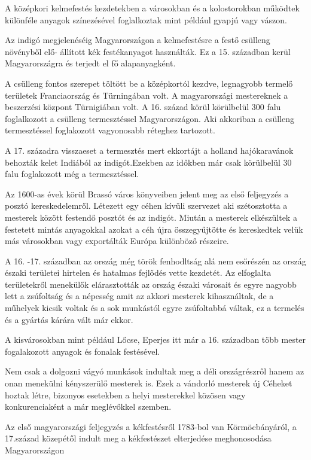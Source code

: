 \documentclass[fontsize=12pt, appendixprefix=true]{scrreprt}
\begin{document}
A középkori kelmefestés kezdetekben a városokban és a kolostorokban működtek különféle anyagok színezésével foglalkoztak mint például gyapjú vagy vászon. 

Az indigó megjelenéséig Magyarországon a kelmefestésre a festő csülleng növényből elő- állított kék festékanyagot használták. Ez a 15. században  kerül Magyarországra és terjedt el fő alapanyagként.

A csülleng fontos szerepet töltött be a középkortól kezdve, legnagyobb termelő területek Franciaország és Türningában volt. A magyarországi mestereknek a beszerzési központ Türnigiában volt.
A 16. század körül körülbelül 300 falu foglalkozott a csülleng termesztéssel Magyarországon. Aki akkoriban a csülleng termesztéssel foglakozott vagyonosabb réteghez tartozott. 

A 17. századra visszaeset  a termesztés mert ekkortájt a holland hajókaravánok behozták kelet Indiából az indigót.Ezekben az időkben már csak körülbelül 30 falu foglakozott még a termesztéssel.

Az 1600-as évek körül Brassó város könyveiben jelent meg az első feljegyzés a posztó kereskedelemről.
Létezett egy céhen kívüli szervezet aki szétosztotta  a mesterek között festendő posztót és az indigót. 
Miután a mesterek elkészültek a festetett mintás anyagokkal azokat a céh újra összegyűjtötte és kereskedtek  velük más városokban vagy exportálták Európa különböző részeire.

A 16. -17. században az ország még török fenhodltság alá nem esőrészén az ország északi területei hirtelen és hatalmas fejlődés vette kezdetét.
Az elfoglalta területekről menekülők elárasztották az ország északi városait és egyre nagyobb lett a zsúfoltság és a népesség amit az akkori mesterek kihasználtak, de a műhelyek kicsik voltak és a sok munkástól egyre zsúfoltabbá váltak, ez a termelés és a gyártás kárára vált már ekkor.

A kisvárosokban mint például Lőcse, Eperjes itt már a 16. században több mester  fogalakozott anyagok és fonalak  festésével. 

Nem csak a dolgozni vágyó munkások indultak meg a déli országrészről hanem az onan menekülni kényszerülő mesterek is. Ezek a vándorló mesterek új Céheket hoztak létre, bizonyos esetekben a helyi mesterekkel közösen vagy konkurenciaként a már meglévőkkel szemben. 

Az első magyarországi feljegyzés a kékfestésről 1783-bol van Körmöcbányáról, a 17.század közepétől indult meg a kékfestészet elterjedése meghonosodása Magyarországon  %
\end{document}
